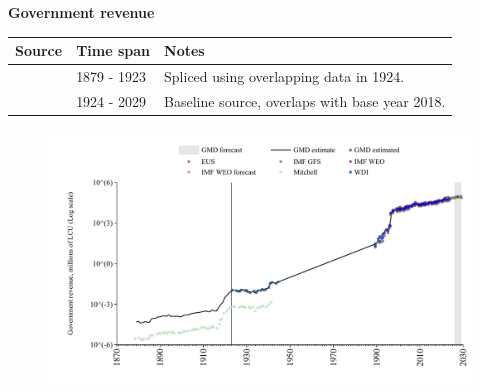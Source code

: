 \documentclass[12pt,a4paper,landscape]{article}
\begin{document}
\begin{adjustbox}{max totalsize={\paperwidth}{\paperheight},center}
\begin{minipage}[t][\textheight][t]{\textwidth}
\vspace*{0.5cm}
{}
\begin{center}
{\Large\bfseries Government revenue}
\end{center}
\vspace{0.5cm}
\begin{table}[H]
\centering
\small
\begin{tabular}{|l|l|l|}
\hline
\textbf{Source} & \textbf{Time span} & \textbf{Notes} \\
\hline
\rowcolor{white}\cite{Mitchell}& 1879 - 1923 &Spliced using overlapping data in 1924. \\
\rowcolor{lightgray}\cite{GMD_estimated}& 1924 - 2029 &Baseline source, overlaps with base year 2018. \\
\hline
\end{tabular}
\end{table}
\begin{figure}[H]
\centering
\includegraphics[width=\textwidth,height=0.6\textheight,keepaspectratio]{graphs/BGR_govrev.pdf}
\end{figure}
\end{minipage}
\end{adjustbox}
\end{document}
